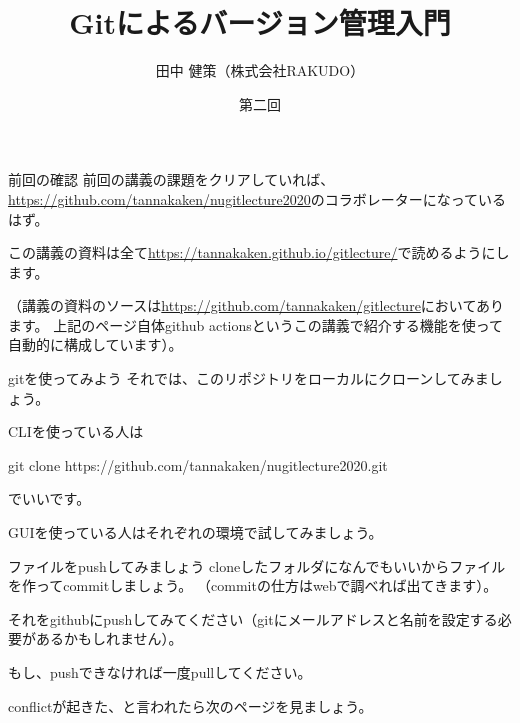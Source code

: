 \documentclass[12pt, unicode]{beamer}
\title{Gitによるバージョン管理入門}
\author{田中 健策（株式会社RAKUDO）}
\date[2020/12/11]{第二回}
\begin{document}
\frame{\maketitle}

\begin{frame}{前回の確認}
前回の講義の課題をクリアしていれば、\url{https://github.com/tannakaken/nugitlecture2020}のコラボレーターになっているはず。

この講義の資料は全て\url{https://tannakaken.github.io/gitlecture/}で読めるようにします。

（講義の資料のソースは\url{https://github.com/tannakaken/gitlecture}においてあります。
上記のページ自体github actionsというこの講義で紹介する機能を使って自動的に構成しています）。

\end{frame}
\begin{frame}{gitを使ってみよう}
それでは、このリポジトリをローカルにクローンしてみましょう。

CLIを使っている人は

git clone https://github.com/tannakaken/nugitlecture2020.git

でいいです。

GUIを使っている人はそれぞれの環境で試してみましょう。

\end{frame}

\begin{frame}{ファイルをpushしてみましょう}
cloneしたフォルダになんでもいいからファイルを作ってcommitしましょう。
（commitの仕方はwebで調べれば出てきます）。

それをgithubにpushしてみてください（gitにメールアドレスと名前を設定する必要があるかもしれません）。

もし、pushできなければ一度pullしてください。

conflictが起きた、と言われたら次のページを見ましょう。

\end{frame}
\end{document}
